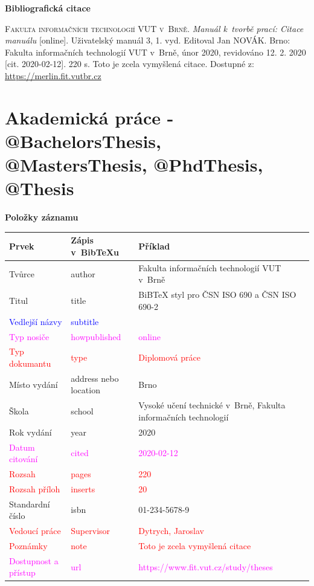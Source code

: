 \bigskip

\noindent \textbf{Bibliografická citace}

\medskip

\noindent \textsc{Fakulta informačních technologií VUT v~Brně}. \textit{Manuál k~tvorbě prací: Citace manuálu} [online]. Uživatelský manuál 3, 1. vyd. Editoval Jan NOVÁK.
Brno: Fakulta informačních technologií VUT v~Brně, únor 2020, revidováno 12. 2. 2020 [cit. 2020-02-12]. 220 s. Toto je zcela vymyšlená citace. Dostupné z: \url{https://merlin.fit.vutbr.cz}
\newpage
\section*{Akademická práce - @BachelorsThesis, @MastersThesis, @PhdThesis, @Thesis}
\label{pr-thesis}
\noindent \textbf{Položky záznamu}

\medskip

\begin{tabularx}{\linewidth}{X X X}
    Prvek & Zápis v~BibTeXu & Příklad\\\hline
    Tvůrce & author & Fakulta informačních technologií VUT v~Brně\\
    Titul & title & BiBTeX styl pro ČSN ISO 690 a ČSN ISO 690-2\\
    \textcolor{blue}{Vedlejší názvy} & \textcolor{blue}{subtitle} & \\
    \textcolor{magenta}{Typ nosiče} & \textcolor{magenta}{howpublished} & \textcolor{magenta}{online}\\
    \textcolor{red}{Typ dokumantu} & \textcolor{red}{type} & \textcolor{red}{Diplomová práce}\\
    Místo vydání & address nebo location & Brno\\
    Škola & school & Vysoké učení technické v~Brně, Fakulta informačních technologií\\
    Rok vydání & year & 2020\\
    \textcolor{magenta}{Datum citování} & \textcolor{magenta}{cited} & \textcolor{magenta}{2020-02-12}\\
    \textcolor{red}{Rozsah} & \textcolor{red}{pages} & \textcolor{red}{220}\\
    \textcolor{red}{Rozsah příloh} & \textcolor{red}{inserts} & \textcolor{red}{20}\\
    Standardní číslo & isbn & 01-234-5678-9\\
    \textcolor{red}{Vedoucí práce} & \textcolor{red}{Supervisor} & \textcolor{red}{Dytrych, Jaroslav}\\
    \textcolor{red}{Poznámky} & \textcolor{red}{note} & \textcolor{red}{Toto je zcela vymyšlená citace}\\
    \textcolor{magenta}{Dostupnost a přístup} & \textcolor{magenta}{url} & \textcolor{magenta}{https://www.fit.vut.cz/study/theses}\\
\end{tabularx}

